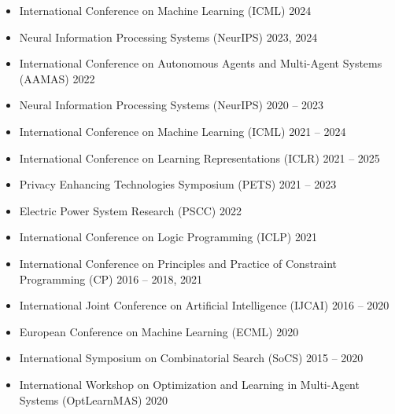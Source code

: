 \begin{itemize}
  \item International Conference on Machine Learning (ICML) \hfill 2024

  \item Neural Information Processing Systems (NeurIPS)  \hfill {2023, 2024}

  \item International Conference on Autonomous Agents and Multi-Agent Systems (AAMAS) \hfill {2022}
\end{itemize}


\begin{itemize}
  \item Neural Information Processing Systems (NeurIPS) 
  \hfill {2020 -- 2023}

  \item International Conference on Machine Learning (ICML) 
  \hfill{2021 -- 2024} 

  \item International Conference on Learning Representations (ICLR)
  \hfill{2021 -- 2025}

  \item Privacy Enhancing Technologies Symposium (PETS) 
  \hfill {2021 -- 2023}

  \item Electric Power System Research (PSCC)
  \hfill{2022}

  \item International Conference on Logic Programming (ICLP) 
  \hfill {2021}

  \item International Conference on Principles and Practice of Constraint Programming (CP) 
  \hfill{2016 -- 2018, 2021} 

  \item International Joint Conference on Artificial Intelligence (IJCAI) 
  \hfill {2016 -- 2020}

  \item European Conference on Machine Learning (ECML) 
  \hfill {2020}

  \item International Symposium on Combinatorial Search (SoCS) 
  \hfill {2015 -- 2020}

  \item International Workshop on Optimization and Learning in 
        Multi-Agent Systems (OptLearnMAS) 
  \hfill {2020}


\end{itemize}
